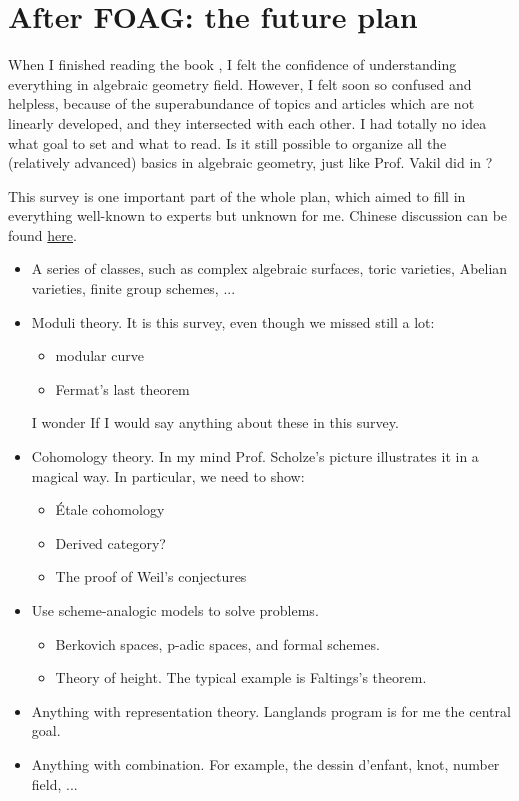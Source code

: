 \section{After FOAG: the future plan}
When I finished reading the book \cite{FOAG}, I felt the confidence of understanding everything in algebraic geometry field. However, I felt soon so confused and helpless, because of the superabundance of topics and articles which are not linearly developed, and they intersected with each other. I had totally no idea what goal to set and what to read. Is it still possible to organize all the (relatively advanced) basics in algebraic geometry, just like Prof. Vakil did in \cite{FOAG}?

This survey is one important part of the whole plan, which aimed to fill in everything well-known to experts but unknown for me. Chinese discussion can be found \href{https://www.zhihu.com/question/318263266}{here}.

\begin{itemize}
\item A series of classes, such as complex algebraic surfaces, toric varieties, Abelian varieties, finite group schemes, ...
\item Moduli theory. It is this survey, even though we missed still a lot:
\begin{itemize}
\item modular curve
\item Fermat's last theorem
\end{itemize}
I wonder If I would say anything about these in this survey.
\item Cohomology theory. In my mind Prof. Scholze's picture illustrates it in a magical way. In particular, we need to show:
\begin{itemize}
\item Étale cohomology
\item Derived category?
\item The proof of Weil's conjectures
\end{itemize}
\item Use scheme-analogic models to solve problems.
\begin{itemize}
\item Berkovich spaces, p-adic spaces, and formal schemes.
\item Theory of height. The typical example is Faltings's theorem. 
\end{itemize}
\item Anything with representation theory. Langlands program is for me the central goal.
\item Anything with combination. For example, the dessin d'enfant, knot, number field, ...
\end{itemize}